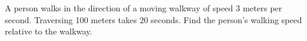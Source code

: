 A person walks in the direction of a moving walkway of speed 3 meters per second. Traversing 100 meters takes 20 seconds. Find the person's walking speed relative to the walkway.
